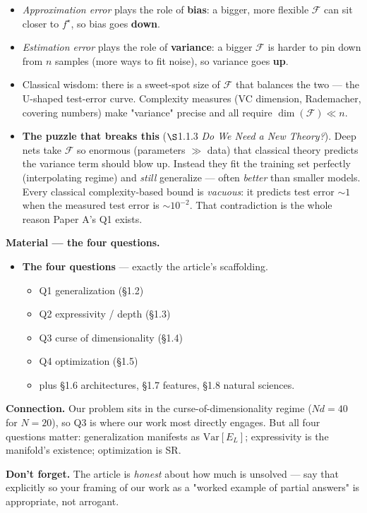 \documentclass[11pt]{article}
\begin{document}
\begin{itemize}
\item \emph{Approximation error} plays the role of \textbf{bias}: a bigger, more flexible
$\mathcal F$ can sit closer to $f^\star$, so bias goes \textbf{down}.
\item \emph{Estimation error} plays the role of \textbf{variance}: a bigger $\mathcal F$
is harder to pin down from $n$ samples (more ways to fit noise), so
variance goes \textbf{up}.
\item Classical wisdom: there is a sweet-spot size of $\mathcal F$ that
balances the two --- the U-shaped test-error curve. Complexity measures (VC
dimension, Rademacher, covering numbers) make "variance" precise and all
require $\dim(\mathcal F)\ll n$.
\item \textbf{The puzzle that breaks this} ($\S$1.1.3 \emph{Do We Need a New Theory?}).
Deep nets take $\mathcal F$ so enormous (parameters $\gg$ data) that
classical theory predicts the variance term should blow up. Instead they
fit the training set perfectly (interpolating regime) and \emph{still}
generalize --- often \emph{better} than smaller models. Every classical
complexity-based bound is \emph{vacuous}: it predicts test error $\sim 1$ when
the measured test error is $\sim 10^{-2}$. That contradiction is the whole
reason Paper A's Q1 exists.
\end{itemize}
\textbf{Material --- the four questions.}

\begin{itemize}
\item \textbf{The four questions} --- exactly the article's scaffolding.
\begin{itemize}
\item Q1 generalization (\S{}1.2)
\item Q2 expressivity / depth (\S{}1.3)
\item Q3 curse of dimensionality (\S{}1.4)
\item Q4 optimization (\S{}1.5)
\item plus \S{}1.6 architectures, \S{}1.7 features, \S{}1.8 natural sciences.
\end{itemize}
\end{itemize}
\textbf{Connection.} Our problem sits in the curse-of-dimensionality regime
($Nd = 40$ for $N{=}20$), so Q3 is where our work most directly engages.
But all four questions matter: generalization manifests as $\mathrm{Var}
[E_L]$; expressivity is the manifold's existence; optimization is SR.

\textbf{Don't forget.} The article is \emph{honest} about how much is unsolved --- say
that explicitly so your framing of our work as a "worked example of partial
answers" is appropriate, not arrogant.
\end{document}
